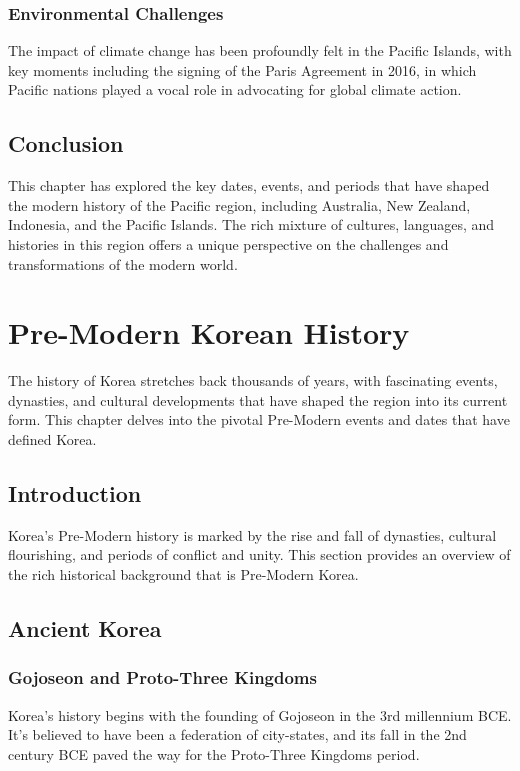 \documentclass[a4paper,12pt]{book}
\begin{document}
\subsection{Environmental Challenges}
\label{subsec:environmental-challenges}
The impact of climate change has been profoundly felt in the Pacific Islands, with key moments including the signing of the Paris Agreement in 2016, in which Pacific nations played a vocal role in advocating for global climate action.

\section{Conclusion}
\label{sec:conclusion-modern-pacific}
This chapter has explored the key dates, events, and periods that have shaped the modern history of the Pacific region, including Australia, New Zealand, Indonesia, and the Pacific Islands. The rich mixture of cultures, languages, and histories in this region offers a unique perspective on the challenges and transformations of the modern world.

\chapter{Pre-Modern Korean History}
\label{ch:pre-modern-korean-history}

The history of Korea stretches back thousands of years, with fascinating events, dynasties, and cultural developments that have shaped the region into its current form. This chapter delves into the pivotal Pre-Modern events and dates that have defined Korea.

\section{Introduction}
\label{sec:introduction-pre-modern-korea}
Korea’s Pre-Modern history is marked by the rise and fall of dynasties, cultural flourishing, and periods of conflict and unity. This section provides an overview of the rich historical background that is Pre-Modern Korea.

\section{Ancient Korea}
\label{sec:ancient-korea}

\subsection{Gojoseon and Proto-Three Kingdoms}
\label{subsec:gojoseon-proto-three-kingdoms}
Korea’s history begins with the founding of Gojoseon in the 3rd millennium BCE. It’s believed to have been a federation of city-states, and its fall in the 2nd century BCE paved the way for the Proto-Three Kingdoms period.
\end{document}
